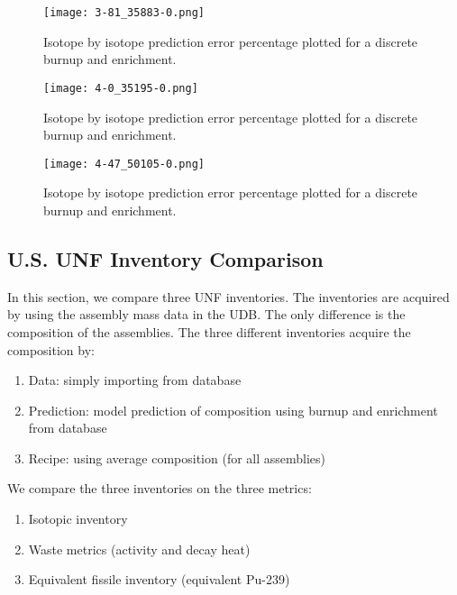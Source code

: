 \begin{figure}
    \centering
    \texttt{[image: 3-81\_35883-0.png]}
    \caption{Isotope by isotope prediction error percentage
             plotted for a discrete burnup and enrichment.
             }
    \label{fig:3-81_35883-0}
\end{figure}



\begin{figure}
    \centering
    \texttt{[image: 4-0\_35195-0.png]}
    \caption{Isotope by isotope prediction error percentage
             plotted for a discrete burnup and enrichment.
             }
    \label{fig:4-0_35195-0}
\end{figure}


\begin{figure}
    \centering
    \texttt{[image: 4-47\_50105-0.png]}
    \caption{Isotope by isotope prediction error percentage
             plotted for a discrete burnup and enrichment.
             }
    \label{fig:4-47_50105-0}
\end{figure}


\subsection{U.S. \gls{UNF} Inventory Comparison}

In this section, we compare three \gls{UNF} inventories.
The inventories are acquired by using the assembly mass data
in the \gls{UDB}. The only difference is the composition of the
assemblies. The three different inventories acquire the composition by:

\begin{enumerate}
    \item Data: simply importing from database
    \item Prediction: model prediction of composition using burnup and enrichment from database
    \item Recipe: using average composition (for all assemblies)
\end{enumerate}

We compare the three inventories on the three
metrics:
\begin{enumerate}
    \item Isotopic inventory
    \item Waste metrics (activity and decay heat)
    \item Equivalent fissile inventory (equivalent Pu-239)
\end{enumerate}

